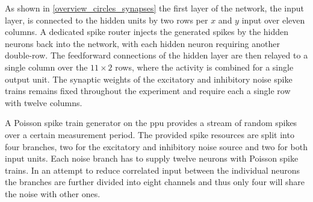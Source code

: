 As shown in \cref{overview_circles_synapses} the first layer of the network, the input layer, is connected to the hidden units by two rows per $x$ and $y$ input over eleven columns. A dedicated spike router injects the generated spikes by the hidden neurons back into the network, with each hidden neuron requiring another double-row. The feedforward connections of the hidden layer are then relayed to a single column over the $11 \times 2$ rows, where the activity is combined for a single output unit. The synaptic weights of the excitatory and inhibitory noise spike trains remains fixed throughout the experiment and require each a single row with twelve columns.

A Poisson spike train generator on the \gls{ppu} provides a stream of random spikes over a certain measurement period. The provided spike resources are split into four branches, two for the excitatory and inhibitory noise source and two for both input units. Each noise branch has to supply twelve neurons with Poisson spike trains. In an attempt to reduce correlated input between the individual neurons the branches are further divided into eight channels and thus only four will share the noise with other ones.

